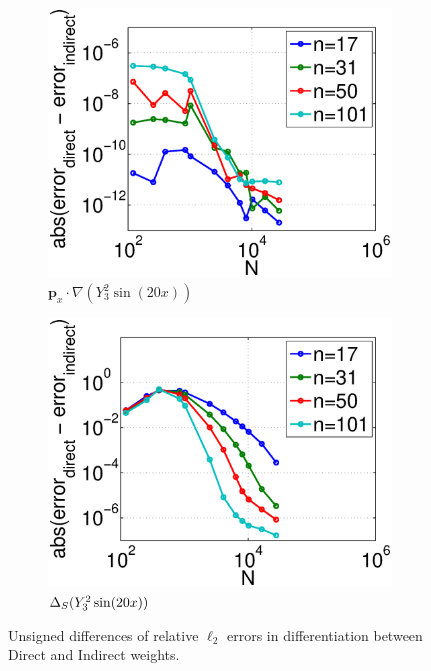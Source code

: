 \begin{figure}
	\centering
		\begin{subfigure}[t]{0.48\textwidth}
		\centering
	\includegraphics[width=1.0\textwidth]{../figures/appendices/direct_vs_indirect_weights/compare_weight_generation/xsfc_vs_xsfc_alt_on_sph32_times_sine_20x/abs_diff_of_rel_l2_errors.eps}
	\caption{$\mathbf{p}_{x} \cdot \nabla ( Y_{3}^{2} \sin(20 x))$}
	\end{subfigure}
	\begin{subfigure}[t]{0.48\textwidth}
	\centering
	\includegraphics[width=1.0\textwidth]{../figures/appendices/direct_vs_indirect_weights/compare_weight_generation/lsfc_vs_px_grad_dot_px_grad/abs_diff_of_rel_l2_errors.eps}
	\caption{$\Delta_S ( Y_{3}^{2} \sin(20 x) )$}
	\end{subfigure}
		\caption{Unsigned differences of relative $\ell_{2}$ errors in differentiation between Direct and Indirect weights.}
		\label{fig:direct_vs_indirect_unsigned_diff}
\end{figure}



%
%
%

